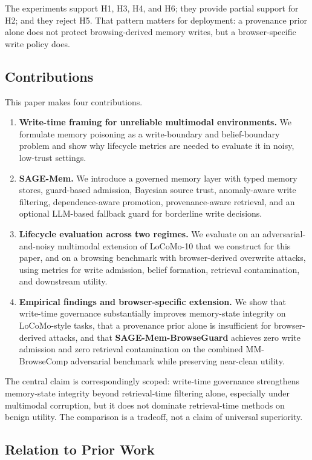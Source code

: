 \documentclass{article}
\begin{document}
The experiments support H1, H3, H4, and H6; they provide partial support for H2; and they reject H5. That pattern matters for deployment: a provenance prior alone does not protect browsing-derived memory writes, but a browser-specific write policy does.

\subsection{Contributions}

This paper makes four contributions.

\begin{enumerate}
\item \textbf{Write-time framing for unreliable multimodal environments.} We formulate memory poisoning as a write-boundary and belief-boundary problem and show why lifecycle metrics are needed to evaluate it in noisy, low-trust settings.
\item \textbf{SAGE-Mem.} We introduce a governed memory layer with typed memory stores, guard-based admission, Bayesian source trust, anomaly-aware write filtering, dependence-aware promotion, provenance-aware retrieval, and an optional LLM-based fallback guard for borderline write decisions.
\item \textbf{Lifecycle evaluation across two regimes.} We evaluate on an adversarial-and-noisy multimodal extension of LoCoMo-10 that we construct for this paper, and on a browsing benchmark with browser-derived overwrite attacks, using metrics for write admission, belief formation, retrieval contamination, and downstream utility.
\item \textbf{Empirical findings and browser-specific extension.} We show that write-time governance substantially improves memory-state integrity on LoCoMo-style tasks, that a provenance prior alone is insufficient for browser-derived attacks, and that \textbf{SAGE-Mem-BrowseGuard} achieves zero write admission and zero retrieval contamination on the combined MM-BrowseComp adversarial benchmark while preserving near-clean utility.
\end{enumerate}

The central claim is correspondingly scoped: write-time governance strengthens memory-state integrity beyond retrieval-time filtering alone, especially under multimodal corruption, but it does not dominate retrieval-time methods on benign utility. The comparison is a tradeoff, not a claim of universal superiority.

\subsection{Relation to Prior Work}
\end{document}
